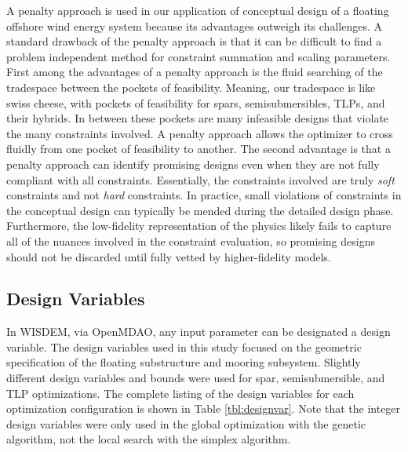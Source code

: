 A penalty approach is used in our application of conceptual design of a
floating offshore wind energy system because its advantages outweigh its
challenges.  A standard drawback of the penalty approach is that it can
be difficult to find a problem independent method for constraint
summation and scaling parameters.  First among the advantages of a
penalty approach is the fluid searching of the tradespace between the
pockets of feasibility.  Meaning, our tradespace is like swiss cheese,
with pockets of feasibility for spars, semisubmersibles, TLPs, and their
hybrids.  In between these pockets are many infeasible designs that
violate the many constraints involved.  A penalty approach allows the
optimizer to cross fluidly from one pocket of feasibility to another.
The second advantage is that a penalty approach can identify promising
designs even when they are not fully compliant with all constraints.
Essentially, the constraints involved are truly \textit{soft}
constraints and not \textit{hard} constraints.  In practice, small
violations of constraints in the conceptual design can typically be
mended during the detailed design phase.  Furthermore, the low-fidelity
representation of the physics likely fails to capture all of the nuances
involved in the constraint evaluation, so promising designs should not
be discarded until fully vetted by higher-fidelity models.

\subsection{Design Variables}
In WISDEM, via OpenMDAO, any input parameter can be designated a design
variable.  The design variables used in this study focused on the
geometric specification of the floating substructure and mooring
subsystem.  Slightly different design variables and bounds were used for
spar, semisubmersible, and TLP optimizations.  The complete listing of
the design variables for each optimization configuration is shown in
Table \ref{tbl:designvar}.  Note that the integer design variables were
only used in the global optimization with the genetic algorithm, not the
local search with the simplex algorithm.

